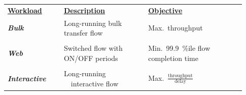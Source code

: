 \begin{Large}
\begin{frame}[plain]
\begin{table}
\begin{tabular}{|p{0.22\linewidth}|p{0.33\linewidth}|p{0.38\linewidth}|}
\hline
{\bf \underline{Workload}} & {\bf \underline{Description}} & {\bf \underline{Objective}} \\
\textbf{\emph{Bulk}} & Long-running bulk transfer flow & Max.~throughput \\
& &\\
\textbf{\emph{Web}} & Switched flow with ON/OFF periods &
Min.~99.9~\%ile flow completion time \\
& &\\
\textbf{\emph{Interactive}} & Long-running \ \  interactive flow & Max.~$\frac{\mbox{throughput}}{\mbox{delay}}$ \\ 
\hline
\end{tabular}
\end{table}
\end{frame}


\end{Large}
